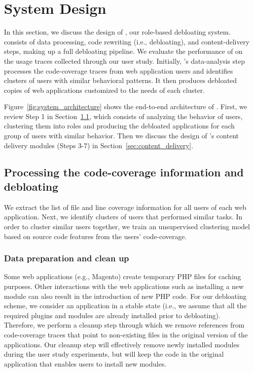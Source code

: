 \section{System Design}

In this section, we discuss the design of \dbltr{}, our role-based debloating system. 
\dbltr{} consists of data processing, code rewriting (i.e., debloating), and content-delivery steps, making up a full debloating pipeline. 
We evaluate the performance of \dbltr{} on the usage traces collected through our user study. 
Initially, \dbltr{}'s data-analysis step processes the code-coverage traces from web application users and identifies clusters of users with similar behavioral patterns. 
It then produces debloated copies of web applications customized to the needs of each cluster. 

Figure~\ref{fig:system_architecture} shows the end-to-end architecture of \dbltr{}. 
First, we review Step 1 in Section~\ref{sec:debloating}, which consists of analyzing the behavior of users, clustering them into roles and producing the debloated applications for each group of users with similar behavior. 
Then we discuss the design of \dbltr{}'s content delivery modules (Steps 3-7) in Section~\ref{sec:content_delivery}. 

\subsection{Processing the code-coverage information and debloating}
\label{sec:debloating}

We extract the list of file and line coverage information for all users of each web application. 
Next, we identify clusters of users that performed similar tasks. 
In order to cluster similar users together, we train an unsupervised clustering model based on source code features from the users' code-coverage.  

\subsubsection{Data preparation and clean up}

Some web applications (e.g., Magento) create temporary PHP files for caching purposes. 
Other interactions with the web applications such as installing a new module can also result in the introduction of new PHP code. 
For our debloating scheme, we consider an application in a stable state (i.e., we assume that all the required plugins and modules are already installed prior to debloating). 
Therefore, we perform a cleanup step through which we remove references from code-coverage traces that point to non-existing files in the original version of the applications. Our cleanup step will effectively remove newly installed modules during the user study experiments, but will keep the code in the original application that enables users to install new modules. 

